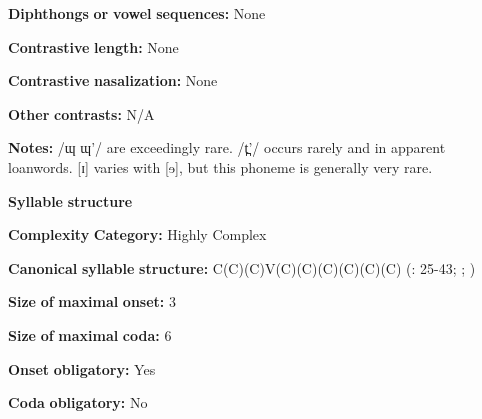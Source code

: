 \begin{styleBody}
\textbf{Diphthongs} \textbf{or} \textbf{vowel} \textbf{sequences:} None
\end{styleBody}

\begin{styleBody}
\textbf{Contrastive} \textbf{length:} None
\end{styleBody}

\begin{styleBody}
\textbf{Contrastive} \textbf{nasalization:} None
\end{styleBody}

\begin{styleBody}
\textbf{Other} \textbf{contrasts:} N/A
\end{styleBody}

\begin{styleBody}
\textbf{Notes:} /ɰ ɰ’/ are exceedingly rare. /t̪’/ occurs rarely and in apparent loanwords. [ɪ] varies with [ɘ], but this phoneme is generally very rare.
\end{styleBody}

\begin{styleBody}
\textbf{Syllable} \textbf{structure}
\end{styleBody}

\begin{styleBody}
\textbf{Complexity} \textbf{Category:} Highly Complex
\end{styleBody}

\begin{styleBody}
\textbf{Canonical} \textbf{syllable} \textbf{structure:} C(C)(C)V(C)(C)(C)(C)(C)(C) (\citealt{ThompsonThompson1992}: 25-43; \citealt{ThompsonThompson1996}; \citealt{ThompsonEtAl1996})
\end{styleBody}

\begin{styleBody}
\textbf{Size} \textbf{of} \textbf{maximal} \textbf{onset:} 3
\end{styleBody}

\begin{styleBody}
\textbf{Size} \textbf{of} \textbf{maximal} \textbf{coda:} 6
\end{styleBody}

\begin{styleBody}
\textbf{Onset} \textbf{obligatory:} Yes
\end{styleBody}

\begin{styleBody}
\textbf{Coda} \textbf{obligatory:} No
\end{styleBody}

